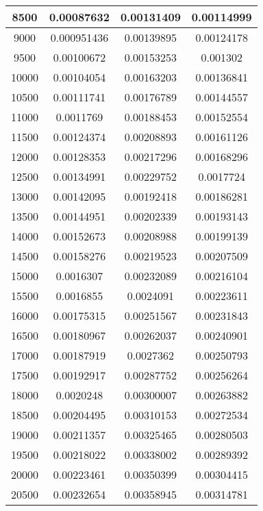 \documentclass{article}
\begin{document}
\begin{longtable}{|c|c|c|c|}
			8500	 &  0.00087632	 &  0.00131409	 &  0.00114999  \\ \hline
			9000	 &  0.000951436	 &  0.00139895	 &  0.00124178  \\ \hline
			9500	 &  0.00100672	 &  0.00153253	 &  0.001302  \\ \hline
			10000	 &  0.00104054	 &  0.00163203	 &  0.00136841  \\ \hline
			10500	 &  0.00111741	 &  0.00176789	 &  0.00144557  \\ \hline
			11000	 &  0.0011769	 &  0.00188453	 &  0.00152554  \\ \hline
			11500	 &  0.00124374	 &  0.00208893	 &  0.00161126  \\ \hline
			12000	 &  0.00128353	 &  0.00217296	 &  0.00168296  \\ \hline
			12500	 &  0.00134991	 &  0.00229752	 &  0.0017724  \\ \hline
			13000	 &  0.00142095	 &  0.00192418	 &  0.00186281  \\ \hline
			13500	 &  0.00144951	 &  0.00202339	 &  0.00193143  \\ \hline
			14000	 &  0.00152673	 &  0.00208988	 &  0.00199139  \\ \hline
			14500	 &  0.00158276	 &  0.00219523	 &  0.00207509  \\ \hline
			15000	 &  0.0016307	 &  0.00232089	 &  0.00216104  \\ \hline
			15500	 &  0.0016855	 &  0.0024091	 &  0.00223611  \\ \hline
			16000	 &  0.00175315	 &  0.00251567	 &  0.00231843  \\ \hline
			16500	 &  0.00180967	 &  0.00262037	 &  0.00240901  \\ \hline
			17000	 &  0.00187919	 &  0.0027362	 &  0.00250793  \\ \hline
			17500	 &  0.00192917	 &  0.00287752	 &  0.00256264  \\ \hline
			18000	 &  0.0020248	 &  0.00300007	 &  0.00263882  \\ \hline
			18500	 &  0.00204495	 &  0.00310153	 &  0.00272534  \\ \hline
			19000	 &  0.00211357	 &  0.00325465	 &  0.00280503  \\ \hline
			19500	 &  0.00218022	 &  0.00338002	 &  0.00289392  \\ \hline
			20000	 &  0.00223461	 &  0.00350399	 &  0.00304415  \\ \hline
			20500	 &  0.00232654	 &  0.00358945	 &  0.00314781  \\ \hline

\end{longtable}
\end{document}
